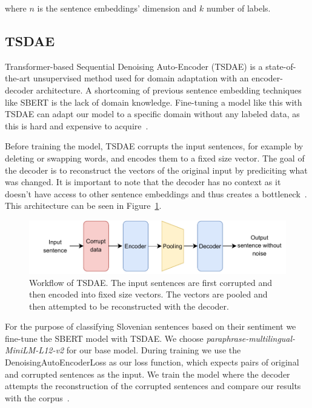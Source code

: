 \documentclass[fleqn,moreauthors,10pt]{ds_report}
\begin{document}
where $n$ is the sentence embeddings' dimension and $k$ number of labels.


\subsection*{TSDAE}

Transformer-based Sequential Denoising Auto-Encoder (TSDAE) is a state-of-the-art unsupervised method used for domain adaptation with an encoder-decoder architecture. A shortcoming of previous sentence embedding techniques like SBERT is the lack of domain knowledge. Fine-tuning a model like this with TSDAE can adapt our model to a specific domain without any labeled data, as this is hard and expensive to acquire~\cite{wang-etal-2021-tsdae-using}.

Before training the model, TSDAE corrupts the input sentences, for example by deleting or swapping words, and encodes them to a fixed size vector. The goal of the decoder is to reconstruct the vectors of the original input by prediciting what was changed. It is important to note that the decoder has no context as it doesn't have access to other sentence embeddings and thus creates a bottleneck~\cite{wang-etal-2021-tsdae-using}. This architecture can be seen in Figure~\ref{fig:tsdae}.

\begin{figure}[ht]\centering
	\vspace{12 pt}
	\includegraphics[width=\linewidth]{TSDAE_scheme.pdf}
	\vspace{5 pt}
	\caption{Workflow of TSDAE. The input sentences are first corrupted and then encoded into fixed size vectors. The vectors are pooled and then attempted to be reconstructed with the decoder.}
	\label{fig:tsdae}
\end{figure}

For the purpose of classifying Slovenian sentences based on their sentiment we fine-tune the SBERT model with TSDAE. We choose \textit{paraphrase-multilingual-MiniLM-L12-v2} for our base model. During training we use the DenoisingAutoEncoderLoss as our loss function, which expects pairs of original and corrupted sentences as the input. We train the model where the decoder attempts the reconstruction of the corrupted sentences and compare our results with the corpus~\cite{SentenceTransformers}.
\end{document}
